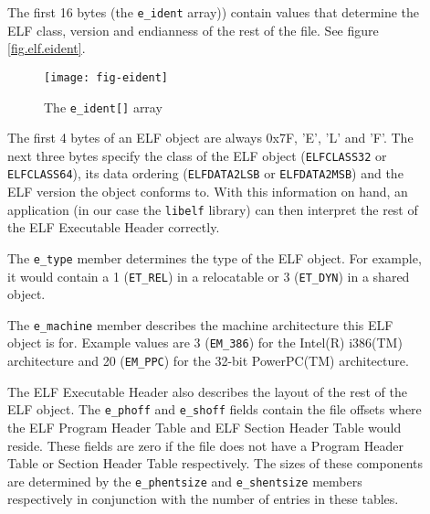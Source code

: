 \documentclass[a4paper]{report}
\makeatletter
\newcommand{\constant}[1]{\texttt{#1}}
\newcommand{\library}[1]{\texttt{#1}}
\newcommand{\parameter}[1]{\texttt{#1}}
\newcommand{\reg}{(R)\xspace}
\newcommand{\trade}{(TM)\xspace}
\newenvironment{callout}[2][blue]{%
  \begingroup\newcommand{\@cocolor}{#1}%
  \newcommand{\@cogroup}[1]{#2}}{\endgroup}
\newcommand{\@co}[1]{\framebox{\textbf{\color{\@cocolor}#1}}}
\newcommand{\coref}[1]{%
  \hypertarget{\@cogroup.#1.cr}{%
    \hyperlink{\@cogroup.#1.co}{\@co{#1}}}}
\makeatother
\begin{document}
\begin{callout}{ehdr}
  \begin{description}
  \item[\coref{1}] The first 16 bytes (the \parameter{e\_ident}
    array)) contain values that determine the ELF class, version and
    endianness of the rest of the file.  See figure
    \vref{fig.elf.eident}.

    \begin{figure}[H]
      \caption{The \parameter{e\_ident[]} array}\label{fig.elf.eident}
      \begin{center}
        \texttt{[image: fig-eident]}
      \end{center}
    \end{figure}

    The first 4 bytes of an ELF object are always 0x7F, 'E', 'L' and
    'F'.  The next three bytes specify the class of the ELF object
    (\constant{ELFCLASS32} or \constant{ELFCLASS64}), its data
    ordering (\constant{ELFDATA2LSB} or \constant{ELFDATA2MSB}) and
    the ELF version the object conforms to.  With this information on
    hand, an application (in our case the \library{libelf} library)
    can then interpret the rest of the ELF Executable Header
    correctly.

  \item[\coref{2}] The \parameter{e\_type} member determines the type
    of the ELF object.  For example, it would contain a 1
    (\constant{ET\_REL}) in a relocatable or 3 (\constant{ET\_DYN}) in
    a shared object.

  \item[\coref{3}] The \parameter{e\_machine} member describes the
    machine architecture this ELF object is for.  Example values are 3
    (\constant{EM\_386}) for the Intel\reg i386\trade architecture and
    20 (\constant{EM\_PPC}) for the 32-bit PowerPC\trade architecture.

  \item[\coref{4} \coref{5}] The ELF Executable Header also describes
    the layout of the rest of the ELF object.  The
    \parameter{e\_phoff} and \parameter{e\_shoff} fields contain the
    file offsets where the ELF Program Header Table and ELF Section
    Header Table would reside.  These fields are zero if the file does
    not have a Program Header Table or Section Header Table
    respectively.  The sizes of these components are determined by the
    \parameter{e\_phentsize} and \parameter{e\_shentsize} members
    respectively in conjunction with the number of entries in these
    tables.


\end{description}
\end{callout}
\end{document}
